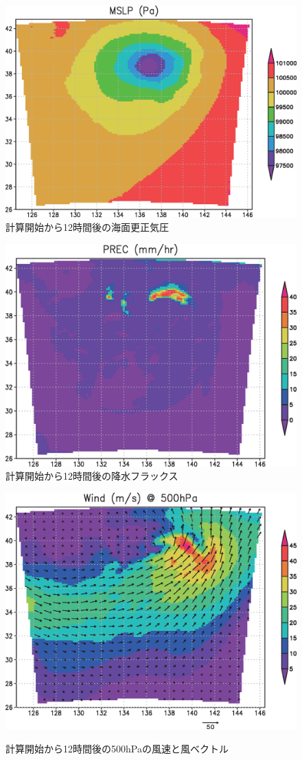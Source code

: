 \begin{figure}[h]
\begin{center}
  \includegraphics[width=0.55\hsize]{./figure/real_mslp.eps}\\
  \caption{計算開始から12時間後の海面更正気圧}
  \label{fig:real_mslp}
\end{center}
\begin{center}
  \includegraphics[width=0.55\hsize]{./figure/real_prec.eps}\\
  \caption{計算開始から12時間後の降水フラックス}
  \label{fig:real_prec}
\end{center}
\begin{center}
  \includegraphics[width=0.55\hsize]{./figure/real_wind.eps}\\
  \caption{計算開始から12時間後の500hPaの風速と風ベクトル}
  \label{fig:real_wind}
\end{center}
\end{figure}



